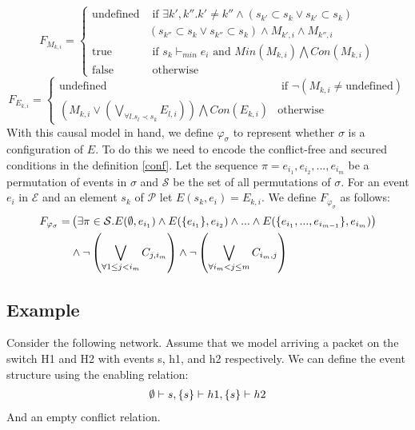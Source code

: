 \documentclass{article}
\begin{document}
$$
    F_{M_{k,i}} = \begin{cases}
        \text{undefined} & \text{ if } 
            \exists k',k''. k' \neq k'' \wedge 
            \left( s_{k'} \subset s_k \vee s_{k'} \subset s_k \right) 
            \\
            & \left( s_{k''} \subset s_k \vee s_{k''} \subset s_k \right) \wedge
 M_{k',i} \wedge M_{k'',i} \\ 
        \text{true}      & \text{ if }
        s_k \vdash_{min} e_i \text{ and }
        Min(M_{k,i}) \bigwedge Con(M_{k,i})
        \\
        \text{false}     & \text{ otherwise}
    \end{cases}
$$
$$
    F_{E_{k,i}} = \begin{cases}
        \text{undefined} & \text{ if } \neg \left( M_{k,i} \neq \text{undefined}
         \right) \\
        \left(
        M_{k,i} \vee
        \left(
        \bigvee_{\forall l. s_l  \prec s_k}E_{l,i}
        \right)
        \right) 
        \bigwedge
        Con(E_{k,i})
        & \text{otherwise}
        \end{cases}
$$
With this causal model in hand, we define $\varphi_{\sigma}$ to represent whether $\sigma$ is a configuration of $E$.
To do this we need to encode the conflict-free and secured conditions in the definition \ref{conf}.
Let the sequence $\pi = e_{i_1},e_{i_2},...,e_{i_m}$ be a
permutation of events in $\sigma$ and $\mathcal{S}$ be the set of
all permutations of $\sigma$.
For an event $e_i$ in $\mathcal{E}$ and an element $s_k$ of
$\mathcal{P}$ let $E(s_k, e_i) = E_{k,i}$.
We define $F_{\varphi_{\sigma}}$ as follows:
\begin{align*}
    F_{\varphi_{\sigma}} = &
    \left(
    \exists \pi \in \mathcal{S}. E(\emptyset, e_{i_1})
    \wedge E(\{e_{i_1}\}, e_{i_2} )
    \wedge ...
    \wedge E(\{e_{i_1},...,e_{i_{m-1}}\},e_{i_m})
    \right)                                     \\
                           & \wedge \neg \left(
    \bigvee_{\forall 1 \leq j < i_m } C_{j,i_m}
    \right)
    \wedge \neg \left(
    \bigvee_{\forall i_m < j\leq m } C_{i_m,j}
    \right)
\end{align*}

\subsection{Example}

\begin{example}
    Consider the following network. 
    Assume that we model arriving a packet on the switch H1 and H2 with events s, h1, and h2 respectively.
    We can define the event structure using the enabling relation:
    \begin{align*}
        \emptyset \vdash s, \{s\} \vdash h1, \{s\} \vdash h2
    \end{align*}
    And an empty conflict relation.
\end{example}
\end{document}

